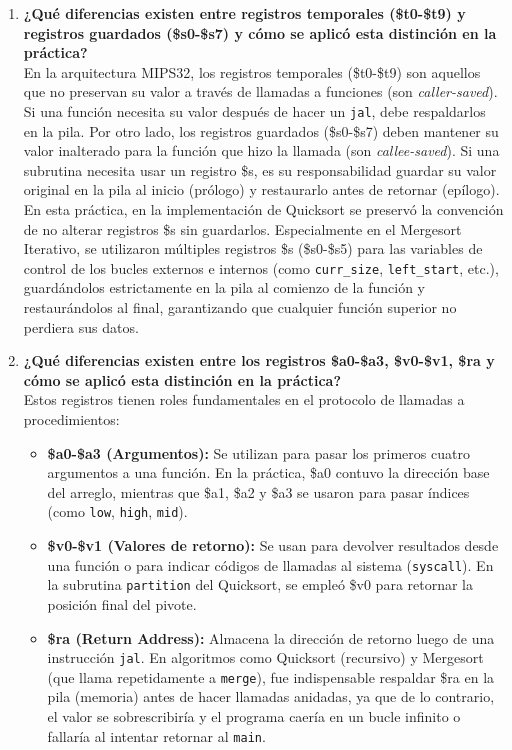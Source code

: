 \documentclass[12pt,letterpaper]{article}
\begin{document}
\begin{enumerate}[label=\textbf{\arabic*.}, leftmargin=*]
    \item \textbf{¿Qué diferencias existen entre registros temporales (\$t0-\$t9) y registros guardados (\$s0-\$s7) y cómo se aplicó esta distinción en la práctica?} \\
    En la arquitectura MIPS32, los registros temporales (\$t0-\$t9) son aquellos que no preservan su valor a través de llamadas a funciones (son \textit{caller-saved}). Si una función necesita su valor después de hacer un \texttt{jal}, debe respaldarlos en la pila. Por otro lado, los registros guardados (\$s0-\$s7) deben mantener su valor inalterado para la función que hizo la llamada (son \textit{callee-saved}). Si una subrutina necesita usar un registro \$s, es su responsabilidad guardar su valor original en la pila al inicio (prólogo) y restaurarlo antes de retornar (epílogo). En esta práctica, en la implementación de Quicksort se preservó la convención de no alterar registros \$s sin guardarlos. Especialmente en el Mergesort Iterativo, se utilizaron múltiples registros \$s (\$s0-\$s5) para las variables de control de los bucles externos e internos (como \texttt{curr\_size}, \texttt{left\_start}, etc.), guardándolos estrictamente en la pila al comienzo de la función y restaurándolos al final, garantizando que cualquier función superior no perdiera sus datos.

    \item \textbf{¿Qué diferencias existen entre los registros \$a0-\$a3, \$v0-\$v1, \$ra y cómo se aplicó esta distinción en la práctica?} \\
    Estos registros tienen roles fundamentales en el protocolo de llamadas a procedimientos:
    \begin{itemize}
        \item \textbf{\$a0-\$a3 (Argumentos):} Se utilizan para pasar los primeros cuatro argumentos a una función. En la práctica, \$a0 contuvo la dirección base del arreglo, mientras que \$a1, \$a2 y \$a3 se usaron para pasar índices (como \texttt{low}, \texttt{high}, \texttt{mid}).
        \item \textbf{\$v0-\$v1 (Valores de retorno):} Se usan para devolver resultados desde una función o para indicar códigos de llamadas al sistema (\texttt{syscall}). En la subrutina \texttt{partition} del Quicksort, se empleó \$v0 para retornar la posición final del pivote.
        \item \textbf{\$ra (Return Address):} Almacena la dirección de retorno luego de una instrucción \texttt{jal}. En algoritmos como Quicksort (recursivo) y Mergesort (que llama repetidamente a \texttt{merge}), fue indispensable respaldar \$ra en la pila (memoria) antes de hacer llamadas anidadas, ya que de lo contrario, el valor se sobrescribiría y el programa caería en un bucle infinito o fallaría al intentar retornar al \texttt{main}.
    \end{itemize}


\end{enumerate}
\end{document}
